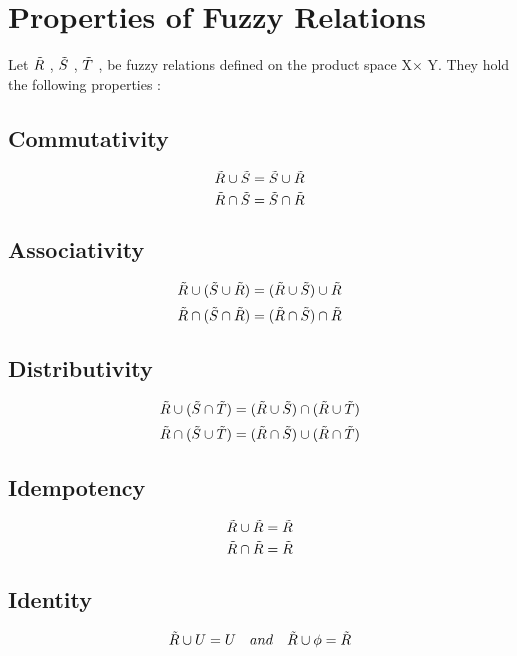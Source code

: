 \documentclass{article}
\begin{document}
\section{Properties of Fuzzy Relations}
Let $\Tilde{R}$ , $\Tilde{S}$ , $\Tilde{T}$ , be fuzzy relations defined on the product space X$\times$ Y. They hold the following properties :\newline
\subsection{Commutativity}
\begin{equation}
    \Tilde{R}\cup\Tilde{S}=\Tilde{S}\cup\Tilde{R}
\end{equation}
\begin{equation}
    \Tilde{R}\cap\Tilde{S}=\Tilde{S}\cap\Tilde{R}
\end{equation}
\subsection{Associativity}
\begin{equation}
    \Tilde{R}\cup(\Tilde{S}\cup\Tilde{R})=(\Tilde{R}\cup\Tilde{S})\cup\Tilde{R}
\end{equation}
\begin{equation}
    \Tilde{R}\cap(\Tilde{S}\cap\Tilde{R})=(\Tilde{R}\cap\Tilde{S})\cap\Tilde{R}
\end{equation}
\subsection{Distributivity}
\begin{equation}
    \Tilde{R}\cup(\Tilde{S}\cap\Tilde{T})=(\Tilde{R}\cup\Tilde{S})\cap(\Tilde{R}\cup\Tilde{T})
\end{equation}
\begin{equation}
    \Tilde{R}\cap(\Tilde{S}\cup\Tilde{T})=(\Tilde{R}\cap\Tilde{S})\cup(\Tilde{R}\cap\Tilde{T})
\end{equation}
\subsection{Idempotency}
\begin{equation}
    \Tilde{R}\cup\Tilde{R}=\Tilde{R}
\end{equation}
\begin{equation}
    \Tilde{R}\cap\Tilde{R}=\Tilde{R}
\end{equation}
\subsection{Identity}
\begin{equation}
    \Tilde{R}\cup U=U\quad and\quad 
    \Tilde{R}\cup\phi=\Tilde{R}
\end{equation}
\end{document}
